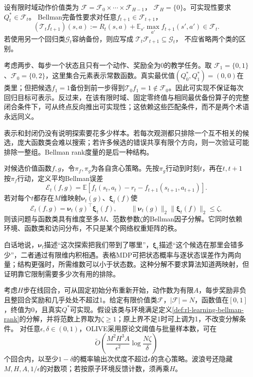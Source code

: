 \begin{definition}[可实现性与Bellman完备性]
  \label{def:rl-learning-realizability}
  设有限时域动作价值类为
  $\mathcal F=\mathcal F_0\times\cdots\times\mathcal F_{H-1}$，
  $\mathcal F_H=\{0\}$。可实现性要求$Q_t^*\in\mathcal F_t$。
  Bellman完备性要求对任意$f_{t+1}\in\mathcal F_{t+1}$，
  \[
    (\mathcal T_t f_{t+1})(s,a)
       :=R_t(s,a)+\mathbb E_{s'}\max_{a'}f_{t+1}(s',a')
                  \in\mathcal F_t.
  \]
  若使用另一个回归类$\mathcal G_t$容纳备份，则应写成
  $\mathcal T_t\mathcal F_{t+1}\subseteq\mathcal G_t$，
  不应省略两个类的区别。
\end{definition}

考虑两步、每步一个状态且只有一个动作、奖励全为0的教学任务。取
$\mathcal F_1=\{0,1\}$、$\mathcal F_0=\{0,2\}$，这里集合元素表示常数函数。真实最优值$(Q_0^*,Q_1^*)=(0,0)$在类里；但把候选$f_1=1$备份到前一步得到$\mathcal T_0f_1=1\notin\mathcal F_0$。因此可实现不保证每次回归目标可表示。反过来，在该有限时域、固定零终值与相同最优备份算子的完整闭合条件下，可从终点反向推出可实现性；这依赖这些匹配条件，而不是两个术语永远同义。

表示和封闭仍没有说明探索要花多少样本。若每次观测都只排除一个互不相关的候选，庞大函数类会难以搜索；若许多候选的错误共享有限个方向，则一次验证可能排除一整组。Bellman rank度量的是后一种结构。

\begin{definition}[一种Bellman因子分解]
  \label{def:rl-learning-bellman-rank}
  对候选价值函数$f,g$，令$\pi_f,\pi_g$为各自贪心策略。先按$\pi_g$行动到时刻$t$，再在$t,t+1$按$\pi_f$行动，定义平均Bellman误差
  \[
    \mathcal E_t(f,g)
     =\mathbb E[
        f_t(s_t,a_t)-r_t-f_{t+1}(s_{t+1},a_{t+1})].
  \]
  若对每个$t$都存在$M$维映射$\bm\nu_t(g)$、$\bm\xi_t(f)$使
  \[
    \mathcal E_t(f,g)=\bm\nu_t(g)^\top\bm\xi_t(f),\qquad
    \|\bm\nu_t(g)\|_2\|\bm\xi_t(f)\|_2\leq\zeta,
  \]
  则该问题与函数类具有维度至多$M$、范数参数$\zeta$的Bellman因子分解。它同时依赖环境、函数类和访问分布，不只是某个网络权重矩阵的秩。
\end{definition}

白话地说，$\bm\nu_t$描述“这次探索把我们带到了哪里”，$\bm\xi_t$描述“这个候选在那里会错多少”，二者通过有限维内积相遇。表格MDP可把状态概率与逐状态误差作为两向量；结构更强时，所需维数可以小于状态数。这种分解不要求算法知道两映射，但证明靠它限制需要多少次有用的排除。

\begin{theorem}
  \label{thm:rl-learning-olive}
  考虑$H$步在线回合，可从固定初始分布重新开始，动作数为有限$A$，每步奖励非负且整回合奖励和几乎处处不超过1。给定有限价值类$\mathcal F$，$|\mathcal F|=N$，函数值在$[0,1]$，终值为0，且真实$Q^*$可实现。假设该类与环境满足定义\ref{def:rl-learning-bellman-rank}的分解，并将范数上界取为$\zeta\geq1$；原上界不足1时可上调为1，不改变分解条件。
  对任意$\epsilon,\delta\in(0,1)$，OLIVE采用原论文阈值与批量样本数，可在
  \[
    \widetilde O\left(
       \frac{M^2H^3A}{\epsilon^2}
                         \log\frac{N\zeta}{\delta}\right)
  \]
  个回合内，以至少$1-\delta$的概率输出次优度不超过$\epsilon$的贪心策略。波浪号还隐藏$M,H,A,1/\epsilon$的对数项；若按原子环境反馈计数，须再乘$H$。
\end{theorem}

